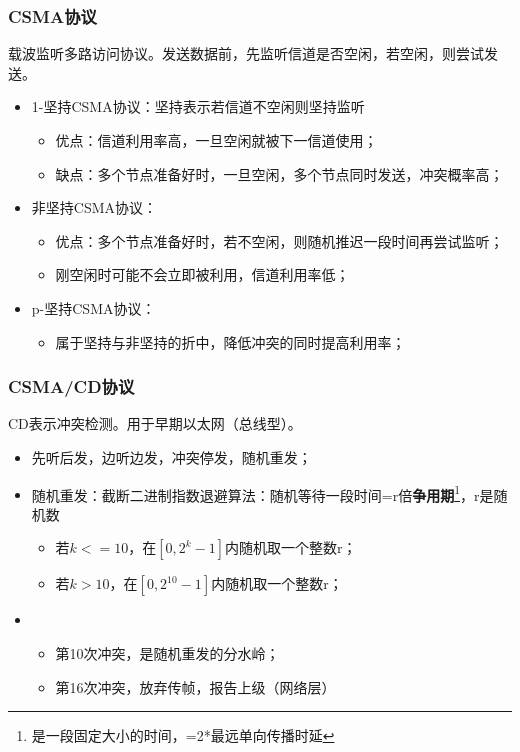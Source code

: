 \subsubsection{CSMA协议}
载波监听多路访问协议。发送数据前，先监听信道是否空闲，若空闲，则尝试发送。
\begin{itemize}
    \item 1-坚持CSMA协议：坚持表示若信道不空闲则坚持监听\begin{itemize}
        \item 优点：信道利用率高，一旦空闲就被下一信道使用；
        \item 缺点：多个节点准备好时，一旦空闲，多个节点同时发送，冲突概率高；
    \end{itemize}
    \item 非坚持CSMA协议：\begin{itemize}
        \item 优点：多个节点准备好时，若不空闲，则随机推迟一段时间再尝试监听；
        \item 刚空闲时可能不会立即被利用，信道利用率低；
    \end{itemize}
    \item p-坚持CSMA协议：\begin{itemize}
        \item 属于坚持与非坚持的折中，降低冲突的同时提高利用率；
    \end{itemize}
\end{itemize}


\subsubsection{CSMA/CD协议}
CD表示冲突检测。用于早期以太网（总线型）。

\begin{itemize}
    \item 先听后发，边听边发，冲突停发，随机重发；
    \item 随机重发：截断二进制指数退避算法：随机等待一段时间=r倍\textbf{争用期}\footnote{是一段固定大小的时间，=2*最远单向传播时延}，r是随机数\begin{itemize}
        \item 若\(k <= 10\)，在\([0, 2^k - 1]\)内随机取一个整数r；
        \item 若\(k > 10\)，在\([0, 2^{10} - 1]\)内随机取一个整数r；
    \end{itemize}
    \item \begin{itemize}
        \item 第10次冲突，是随机重发的分水岭；
        \item 第16次冲突，放弃传帧，报告上级（网络层）
    \end{itemize}
\end{itemize}


